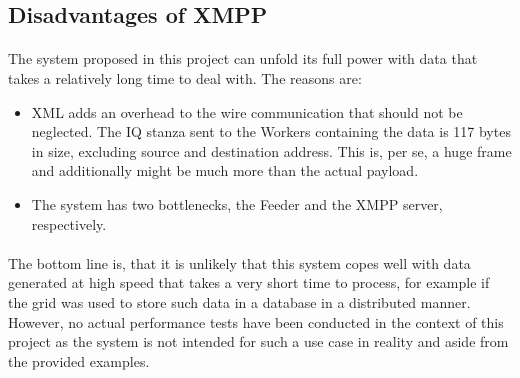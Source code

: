 \subsection{Disadvantages of XMPP}
\paragraph{}
The system proposed in this project can unfold its full power with data that takes a relatively long time to deal with. The reasons are:
\begin{itemize}
\item XML adds an overhead to the wire communication that should not be neglected. The IQ stanza sent to the Workers containing the data is 117 bytes in size, excluding source and destination address. This is, per se, a huge frame and additionally might be much more than the actual payload.
\item The system has two bottlenecks, the Feeder and the XMPP server, respectively.
\end{itemize}

\paragraph{}
The bottom line is, that it is unlikely that this system copes well with data generated at high speed that takes a very short time to process, for example if the grid was used to store such data in a database in a distributed manner. However, no actual performance tests have been conducted in the context of this project as the system is not intended for such a use case in reality and aside from the provided examples.
